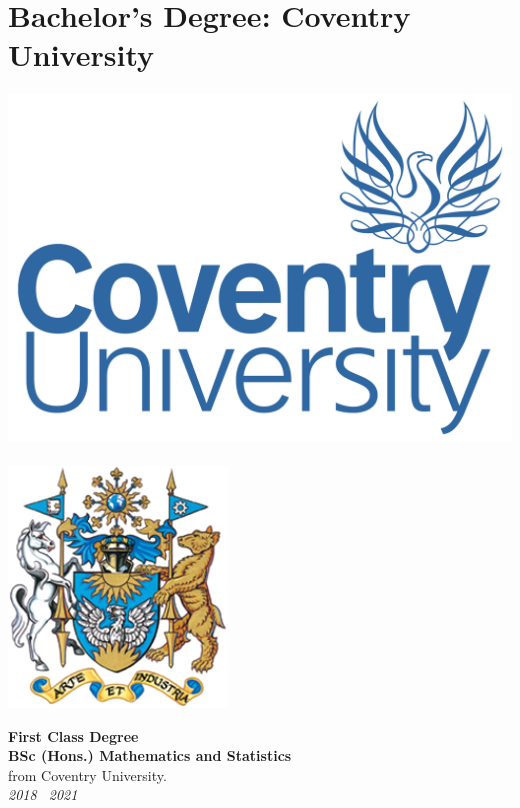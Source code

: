 \documentclass[9pt,a4paper]{article}
\begin{document}
\section{Bachelor's Degree: Coventry University}
\begin{center}
	\includegraphics[height=0.15\textheight]{covuni.jpg}\\\quad\\
	\includegraphics[height=0.15\textheight]{covuni_coa.png}
\end{center}
\begin{center}
\noindent\textbf{First Class Degree}\\
\noindent\textbf{BSc (Hons.) Mathematics and Statistics}\\
\noindent from Coventry University.\\
\noindent\emph{ 2018 \textemdash\ 2021}
\end{center}
\end{document}
